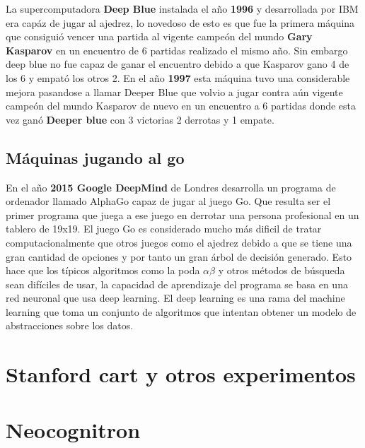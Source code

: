 \documentclass[a4paper, 11pt]{article} %
\begin{document}
La supercomputadora \textbf{Deep Blue} instalada el año \textbf{1996} y desarrollada por IBM era capáz de jugar al ajedrez, lo novedoso de esto es que fue la primera máquina que consiguió vencer una partida al vigente campeón del mundo \textbf{Gary Kasparov} en un encuentro de 6 partidas realizado el mismo año. Sin embargo deep blue no fue capaz de ganar el encuentro debido a que Kasparov gano 4 de los 6 y empató los otros 2. En el año \textbf{1997} esta máquina tuvo una considerable mejora pasandose a llamar Deeper Blue que volvio a jugar contra aún vigente campeón del mundo Kasparov de nuevo en un encuentro a 6 partidas donde esta vez ganó \textbf{Deeper blue} con 3 victorias 2 derrotas y 1 empate.

\subsection{Máquinas jugando al go}

En el año \textbf{2015 Google DeepMind} de Londres desarrolla un programa de ordenador llamado AlphaGo capaz de jugar al juego Go. Que resulta ser el primer programa que juega a ese juego en derrotar una persona profesional en un tablero de 19x19. El juego Go es considerado mucho más dificil de tratar computacionalmente que otros juegos como el ajedrez debido a que se tiene una gran cantidad de opciones y por tanto un gran árbol de decisión generado. Esto hace que los típicos algoritmos como la poda $\alpha\beta$ y otros métodos de búsqueda sean difíciles de usar, la capacidad de aprendizaje del programa se basa en una red neuronal que usa deep learning. El deep learning es una rama del machine learning que toma un conjunto de algoritmos que intentan obtener un modelo de abstracciones sobre los datos.

\section{Stanford cart y otros experimentos}
\section{Neocognitron}
\end{document}
